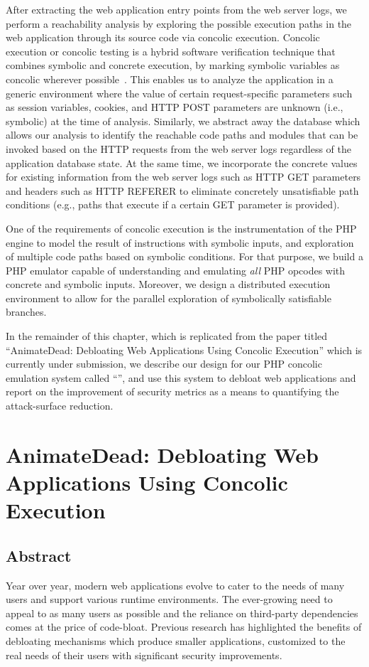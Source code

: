 After extracting the web application entry points from the web server logs, we perform a reachability analysis by exploring the possible execution paths in the web application through its source code via concolic execution. 
Concolic execution or concolic testing is a hybrid software verification technique that combines symbolic and concrete execution, by marking symbolic variables as concolic wherever possible~\cite{sen2007concolic}. 
This enables us to analyze the application in a generic environment where the value of certain request-specific parameters such as session variables, cookies, and HTTP POST parameters are unknown (i.e., symbolic) at the time of analysis. 
Similarly, we abstract away the database which allows our analysis to identify the reachable code paths and modules that can be invoked based on the HTTP requests from the web server logs regardless of the application database state. 
At the same time, we incorporate the concrete values for existing information from the web server logs such as HTTP GET parameters and headers such as HTTP REFERER to eliminate concretely unsatisfiable path conditions (e.g., paths that execute if a certain GET parameter is provided). 

One of the requirements of concolic execution is the instrumentation of the PHP engine to model the result of instructions with symbolic inputs, and exploration of multiple code paths based on symbolic conditions. 
For that purpose, we build a PHP emulator capable of understanding and emulating \emph{all} PHP opcodes with concrete and symbolic inputs. 
Moreover, we design a distributed execution environment to allow for the parallel exploration of symbolically satisfiable branches. 

In the remainder of this chapter, which is replicated from the paper titled ``AnimateDead: Debloating Web Applications Using Concolic Execution'' which is currently under submission, we describe our design for our PHP concolic emulation system called ``\animatedead{}'', and use this system to debloat web applications and report on the improvement of security metrics as a means to quantifying the attack-surface reduction. 

\pagebreak{}

\section*{AnimateDead: Debloating Web Applications Using Concolic Execution}

\subsection*{Abstract}
Year over year, modern web applications evolve to cater to the needs of many users and support various runtime environments. 
The ever-growing need to appeal to as many users as possible and the reliance on third-party dependencies comes at the price of code-bloat. 
Previous research has highlighted the benefits of debloating mechanisms which produce smaller applications, customized to the real needs of their users with significant security improvements. 

